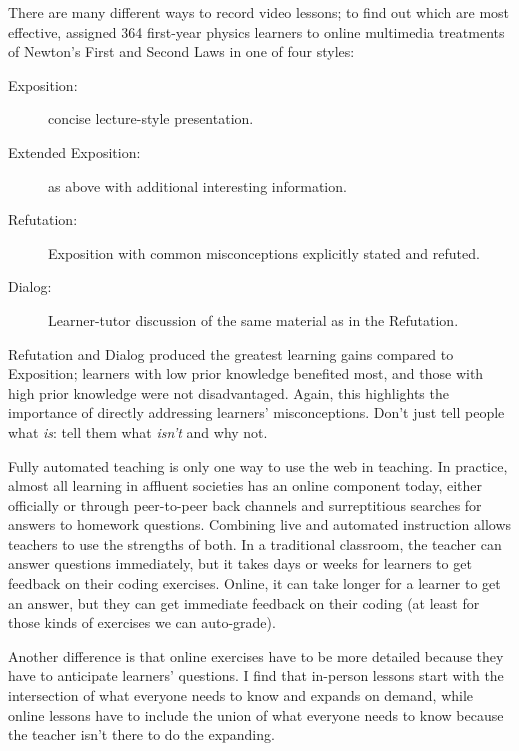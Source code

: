 There are many different ways to record video lessons;
to find out which are most effective,
\cite{Mull2007a} assigned 364 first-year physics learners
to online multimedia treatments of Newton's First and Second Laws in one of four styles:

\begin{description}

\item[Exposition:]
  concise lecture-style presentation.

\item[Extended Exposition:]
  as above with additional interesting information.

\item[Refutation:]
  Exposition with common misconceptions explicitly stated and refuted.

\item[Dialog:]
  Learner-tutor discussion of the same material as in the Refutation.

\end{description}

Refutation and Dialog produced the greatest learning gains compared to Exposition;
learners with low prior knowledge benefited most,
and those with high prior knowledge were not disadvantaged.
Again,
this highlights the importance of directly addressing learners' misconceptions.
Don't just tell people what \emph{is}:
tell them what \emph{isn't} and why not.


Fully automated teaching is only one way to use the web in teaching.
In practice,
almost all learning in affluent societies has an online component today,
either officially
or through peer-to-peer back channels and surreptitious searches for answers to homework questions.
Combining live and automated instruction allows teachers to use the strengths of both.
In a traditional classroom,
the teacher can answer questions immediately,
but it takes days or weeks for learners to get feedback on their coding exercises.
Online,
it can take longer for a learner to get an answer,
but they can get immediate feedback on their coding
(at least for those kinds of exercises we can auto-grade).

Another difference is that
online exercises have to be more detailed
because they have to anticipate learners' questions.
I find that in-person lessons start with the intersection of what everyone needs to know and expands on demand,
while online lessons have to include the union of what everyone needs to know
because the teacher isn't there to do the expanding.

